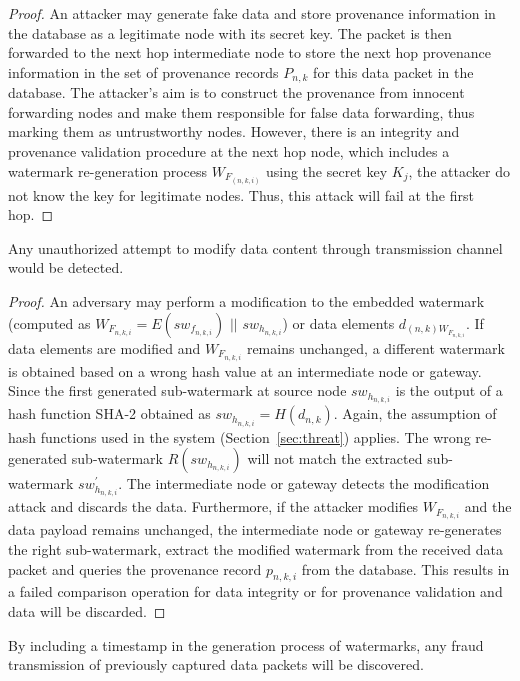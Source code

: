 \documentclass{llncs}
\begin{document}
\begin{proof}
An attacker may generate fake data and store provenance information in the database as a legitimate node with its secret key. The packet is then forwarded to the next hop intermediate node to store the next hop provenance information in the set of provenance records $P_{n,k}$ for this data packet in the database. The attacker's aim is to construct the provenance from innocent forwarding nodes and make them responsible for false data forwarding, thus marking them as untrustworthy nodes. However, there is an integrity and provenance validation procedure at the next hop node, which includes a watermark re-generation process $W_{F_{(n,k,i)}}$ using the  secret key $K_j$, the attacker do not know the key for legitimate nodes. Thus, this attack will fail at the first hop. 
\end{proof}


\begin{theorem}
Any unauthorized attempt to modify data content through transmission channel would be detected.
\end{theorem}

\begin{proof}
An adversary may perform a modification to the embedded watermark (computed as $W_{F_{n,k,i}} = E(sw_{f_{n,k,i}})$ $ || $ $sw_{h_{n,k,i}}$) or data elements $d_{(n,k)W_{F_{n,k,i}}}$. If data elements are modified and $W_{F_{n,k,i}}$ remains unchanged, a different watermark is obtained based on a wrong hash value at an intermediate node or gateway. Since the first generated sub-watermark at source node $sw_{h_{n,k,i}}$ is the output of a hash function SHA-2 obtained as $sw_{h_{n,k,i}} = H(d_{n,k})$. Again, the assumption of hash functions used in the system (Section~\ref{sec:threat}) applies. The wrong re-generated sub-watermark $R(sw_{h_{n,k,i}})$ will not match the extracted sub-watermark $sw^{'}_{h_{n,k,i}}$. The intermediate node or gateway detects the modification attack and discards the data. Furthermore, if the attacker modifies $W_{F_{n,k,i}}$ and the data payload remains unchanged, the intermediate node or gateway re-generates the right sub-watermark, extract the modified watermark from the received data packet and queries the provenance record $p_{n,k,i}$ from the database. This results in a failed comparison operation for data integrity or for provenance validation and data will be discarded.
\end{proof}

\begin{theorem}
By including a timestamp in the generation process of watermarks, any fraud transmission of previously captured data packets will be discovered.
\end{theorem}
\end{document}
